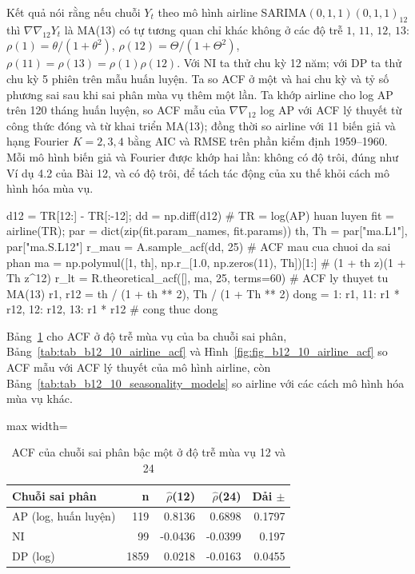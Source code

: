  Kết quả  nói rằng nếu chuỗi $Y_t$ theo mô hình airline SARIMA$(0,1,1)(0,1,1)_{12}$ thì $\nabla\nabla_{12}Y_t$ là MA(13) có tự tương quan chỉ khác không ở các độ trễ $1$, $11$, $12$, $13$: $\rho(1)=\theta/(1+\theta^2)$, $\rho(12)=\Theta/(1+\Theta^2)$, $\rho(11)=\rho(13)=\rho(1)\rho(12)$.
 Với NI ta thử chu kỳ 12 năm; với DP ta thử chu kỳ 5 phiên trên mẫu huấn luyện. Ta so ACF ở một và hai chu kỳ và tỷ số phương sai sau khi sai phân mùa vụ thêm một lần. Ta khớp airline cho log AP trên 120 tháng huấn luyện, so ACF mẫu của $\nabla\nabla_{12}$ log AP với ACF lý thuyết từ công thức đóng và từ khai triển MA(13); đồng thời so airline với 11 biến giả và hạng Fourier $K=2,3,4$ bằng AIC và RMSE trên phần kiểm định 1959--1960. Mỗi mô hình biến giả và Fourier được khớp hai lần: không có độ trôi, đúng như Ví dụ 4.2 của Bài 12, và có độ trôi, để tách tác động của xu thế khỏi cách mô hình hóa mùa vụ.
\begin{codeblock}
d12 = TR[12:] - TR[:-12]; dd = np.diff(d12)                    # TR = log(AP) huan luyen
fit = airline(TR); par = dict(zip(fit.param_names, fit.params))
th, Th = par["ma.L1"], par["ma.S.L12"]
r_mau = A.sample_acf(dd, 25)                           # ACF mau cua chuoi da sai phan
ma = np.polymul([1, th], np.r_[1.0, np.zeros(11), Th])[1:]     # (1 + th z)(1 + Th z^12)
r_lt = R.theoretical_acf([], ma, 25, terms=60)          # ACF ly thuyet tu MA(13)
r1, r12 = th / (1 + th ** 2), Th / (1 + Th ** 2)
dong = {1: r1, 11: r1 * r12, 12: r12, 13: r1 * r12}     # cong thuc dong
\end{codeblock}
 Bảng~\ref{tab:tab_b12_10_seasonal_lags} cho ACF ở độ trễ mùa vụ của ba chuỗi sai phân, Bảng~\ref{tab:tab_b12_10_airline_acf} và Hình~\ref{fig:fig_b12_10_airline_acf} so ACF mẫu với ACF lý thuyết của mô hình airline, còn Bảng~\ref{tab:tab_b12_10_seasonality_models} so airline với các cách mô hình hóa mùa vụ khác.
\begin{table}[H]
\centering\footnotesize
\caption{ACF của chuỗi sai phân bậc một ở độ trễ mùa vụ 12 và 24}\label{tab:tab_b12_10_seasonal_lags}
\begin{adjustbox}{max width=\linewidth}
\begin{tabular}{|l|r|r|r|r|}
\toprule
Chuỗi sai phân & n & $\hat{\rho}$(12) & $\hat{\rho}$(24) & Dải $\pm$ \\
\midrule
AP (log, huấn luyện) & 119 & 0.8136 & 0.6898 & 0.1797 \\
NI & 99 & -0.0436 & -0.0399 & 0.197 \\
DP (log) & 1859 & 0.0218 & -0.0163 & 0.0455 \\
\bottomrule
\end{tabular}
\end{adjustbox}
\end{table}
